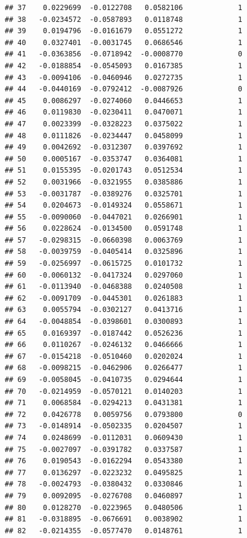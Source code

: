 \documentclass[12pt]{article}\usepackage[]{graphicx}\usepackage[]{xcolor}
\makeatletter
\newenvironment{kframe}{%
 \def\at@end@of@kframe{}%
 \ifinner\ifhmode%
  \def\at@end@of@kframe{\end{minipage}}%
  \begin{minipage}{\columnwidth}%
 \fi\fi%
 \def\FrameCommand##1{\hskip\@totalleftmargin \hskip-\fboxsep
 \colorbox{shadecolor}{##1}\hskip-\fboxsep
     \hskip-\linewidth \hskip-\@totalleftmargin \hskip\columnwidth}%
 \MakeFramed {\advance\hsize-\width
   \@totalleftmargin\z@ \linewidth\hsize
   \@setminipage}}%
 {\par\unskip\endMakeFramed%
 \at@end@of@kframe}
\newenvironment{knitrout}{}{} %
\makeatother
\begin{document}
\begin{knitrout}
\begin{kframe}
\begin{verbatim}
## 37    0.0229699  -0.0122708   0.0582106             1
## 38   -0.0234572  -0.0587893   0.0118748             1
## 39    0.0194796  -0.0161679   0.0551272             1
## 40    0.0327401  -0.0031745   0.0686546             1
## 41   -0.0363856  -0.0718942  -0.0008770             0
## 42   -0.0188854  -0.0545093   0.0167385             1
## 43   -0.0094106  -0.0460946   0.0272735             1
## 44   -0.0440169  -0.0792412  -0.0087926             0
## 45    0.0086297  -0.0274060   0.0446653             1
## 46    0.0119830  -0.0230411   0.0470071             1
## 47    0.0023399  -0.0328223   0.0375022             1
## 48    0.0111826  -0.0234447   0.0458099             1
## 49    0.0042692  -0.0312307   0.0397692             1
## 50    0.0005167  -0.0353747   0.0364081             1
## 51    0.0155395  -0.0201743   0.0512534             1
## 52    0.0031966  -0.0321955   0.0385886             1
## 53   -0.0031787  -0.0389276   0.0325701             1
## 54    0.0204673  -0.0149324   0.0558671             1
## 55   -0.0090060  -0.0447021   0.0266901             1
## 56    0.0228624  -0.0134500   0.0591748             1
## 57   -0.0298315  -0.0660398   0.0063769             1
## 58   -0.0039759  -0.0405414   0.0325896             1
## 59   -0.0256997  -0.0615725   0.0101732             1
## 60   -0.0060132  -0.0417324   0.0297060             1
## 61   -0.0113940  -0.0468388   0.0240508             1
## 62   -0.0091709  -0.0445301   0.0261883             1
## 63    0.0055794  -0.0302127   0.0413716             1
## 64   -0.0048854  -0.0398601   0.0300893             1
## 65    0.0169397  -0.0187442   0.0526236             1
## 66    0.0110267  -0.0246132   0.0466666             1
## 67   -0.0154218  -0.0510460   0.0202024             1
## 68   -0.0098215  -0.0462906   0.0266477             1
## 69   -0.0058045  -0.0410735   0.0294644             1
## 70   -0.0214959  -0.0570121   0.0140203             1
## 71    0.0068584  -0.0294213   0.0431381             1
## 72    0.0426778   0.0059756   0.0793800             0
## 73   -0.0148914  -0.0502335   0.0204507             1
## 74    0.0248699  -0.0112031   0.0609430             1
## 75   -0.0027097  -0.0391782   0.0337587             1
## 76    0.0190543  -0.0162294   0.0543380             1
## 77    0.0136297  -0.0223232   0.0495825             1
## 78   -0.0024793  -0.0380432   0.0330846             1
## 79    0.0092095  -0.0276708   0.0460897             1
## 80    0.0128270  -0.0223965   0.0480506             1
## 81   -0.0318895  -0.0676691   0.0038902             1
## 82   -0.0214355  -0.0577470   0.0148761             1

\end{verbatim}
\end{kframe}
\end{knitrout}
\end{document}
